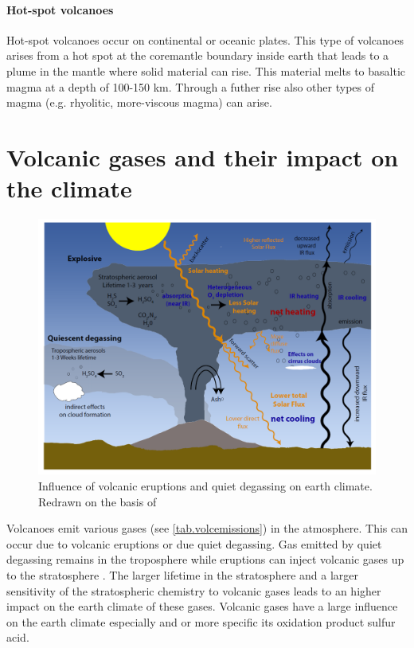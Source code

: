 \documentclass  [
  paper    = a4,
  BCOR     = 10mm,
  twoside,
  fontsize = 12pt,
  fleqn,
  toc      = bibnumbered,
  toc      = listofnumbered,
  numbers  = noendperiod,
  headings = normal,
  listof   = leveldown,
  version  = 3.03
]                                       {scrreprt}
\begin{document}
\paragraph{ Hot-spot volcanoes} Hot-spot volcanoes occur on continental or oceanic plates. This type of volcanoes arises from a hot spot at the coremantle boundary inside earth that leads to a plume in the mantle where solid material can rise. This material melts to basaltic magma at a depth of 100-150 km. Through a futher rise also other types of magma (e.g. rhyolitic, more-viscous magma) can arise.


\section{Volcanic gases and their impact on the climate}
\begin{figure}
	\centering
	\includegraphics[width=0.8\linewidth]{Bilder/Simon/Bilder_Tung/Climate_Influence}
	\caption{Influence of volcanic eruptions and quiet degassing on earth climate. Redrawn on the basis of \cite{robock2000volcanic}}
	\label{fig:climateinfluence}
\end{figure}
Volcanoes emit various gases (see \cref{tab.volcemissions}) in the atmosphere. This can occur due to volcanic eruptions or due quiet degassing. Gas emitted by quiet degassing remains in the troposphere while eruptions can inject volcanic gases up to the stratosphere \citet{robock2000volcanic}. The larger lifetime in the stratosphere and a larger sensitivity of the stratospheric chemistry to volcanic gases leads to an higher impact on the earth climate of these gases.
Volcanic gases have a large influence on the earth climate especially  and   or more specific its oxidation product sulfur acid.\\ 
\end{document}
